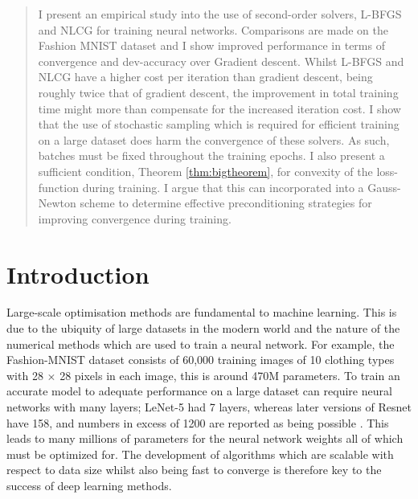 \documentclass[nohyperref]{article}
\theoremstyle{plain}
\theoremstyle{definition}
\theoremstyle{remark}
\begin{document}

\date{\today}

\begin{abstract}
I present an empirical study into the use of second-order solvers, L-BFGS and NLCG for training neural networks. Comparisons are made on the Fashion MNIST dataset and I show improved performance in terms of convergence and dev-accuracy over Gradient descent. Whilst L-BFGS and NLCG have a higher cost per iteration than gradient descent, being roughly twice that of gradient descent, the improvement in total training time might more than compensate for the increased iteration cost. I show that the use of stochastic sampling which is required for efficient training on a large dataset does harm the convergence of these solvers. As such, batches must be fixed throughout the training epochs. I also present a sufficient condition, Theorem \ref{thm:bigtheorem}, for convexity of the loss-function during training. I argue that this can incorporated into a Gauss-Newton scheme to determine effective preconditioning strategies for improving convergence during training. 
\end{abstract}

\section{Introduction}
Large-scale optimisation methods are fundamental to machine learning. This is due to the ubiquity of large datasets in the modern world and the nature of the numerical methods which are used to train a neural network.  For example, the Fashion-MNIST dataset \citep{FashionMNIST:data} consists of 60,000 training images of 10 clothing types with 28 $\times$ 28 pixels in each image, this is around 470M parameters. To train an accurate model to adequate performance on a large dataset can require neural networks with many layers; LeNet-5 \citep{LeCun:5} had 7 layers, whereas later versions of Resnet \citep{ResNet_18} have 158, and numbers in excess of 1200 are reported as being possible \citep{Huang:Stoch}. This leads to many millions of parameters for the neural network weights all of which must be optimized for. The development of algorithms which are scalable with respect to data size whilst also being fast to converge is therefore key to the success of deep learning methods.
\end{document}

